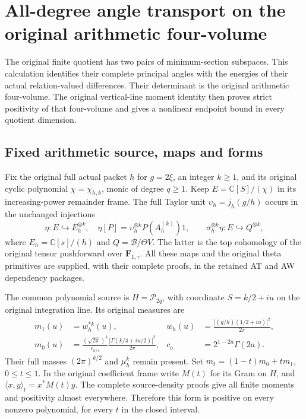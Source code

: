 \begingroup
\def\C{\mathbb C}
\def\Tr{\operatorname{Tr}}
\def\cP{\mathcal P}
\section{All-degree angle transport on the original arithmetic four-volume}
The original finite quotient has two pairs of minimum-section subspaces.
This calculation identifies their complete principal angles with the
energies of their actual relation-valued differences. Their determinant
is the original arithmetic four-volume. The original vertical-line
moment identity then proves strict positivity of that four-volume and
gives a nonlinear endpoint bound in every quotient dimension.

\subsection{Fixed arithmetic source, maps and forms}

Fix the original full actual packet $h$ for $g=2\xi$, an integer
$k\ge1$, and its original cyclic polynomial $\chi=\chi_{h,k}$,
monic of degree $q\ge1$. Keep $E=\C[S]/(\chi)$ in its
increasing-power remainder frame. The full Taylor unit
$\upsilon_h=j_h(g/h)$ occurs in the unchanged injections
\[
 \eta:E\hookrightarrow E_h^{\otimes k},\quad
 \eta[P]=\upsilon_h^{\otimes k}P(A_h^{(k)})1,
 \qquad \sigma_h^{\otimes k}\eta:E\hookrightarrow Q^{\otimes k},
 \tag{AGT1}
\]
where $E_h=\C[s]/(h)$ and $Q=\mathscr B/\Theta V$.
The latter is the top cohomology of the original tensor pushforward
over $\mathbf F_{1,\tau}$. All these maps and the original theta
primitives are supplied, with their complete proofs, in the retained
AT and AW dependency packages.

The common polynomial source is $H=\cP_{2q}$, with coordinate
$S=k/2+iu$ on the original integration line. Its original measures
are
\[
 \begin{aligned}
 m_1(u)&=w_h^{*k}(u),&
 w_h(u)&=\frac{|(g/h)(1/2+iu)|^2}{2\pi},\\
 m_0(u)&=\frac{(\sqrt{2\pi})^k}{c_{k/4}}
       \frac{|\Gamma(k/4+iu/2)|^2}{2\pi},&
 c_a&=2^{1-2a}\Gamma(2a).
 \end{aligned}
 \tag{AGT2}
\]
Their full masses $(2\pi)^{k/2}$ and $\mu_h^k$ remain present.
Set $m_t=(1-t)m_0+tm_1$, $0\le t\le1$. In the original coefficient
frame write $M(t)$ for its Gram on $H$, and
$\langle x,y\rangle_t=x^*M(t)y$.
The complete source-density proofs give all finite moments and
positivity almost everywhere. Therefore this form is positive on
every nonzero polynomial, for every $t$ in the closed interval.

